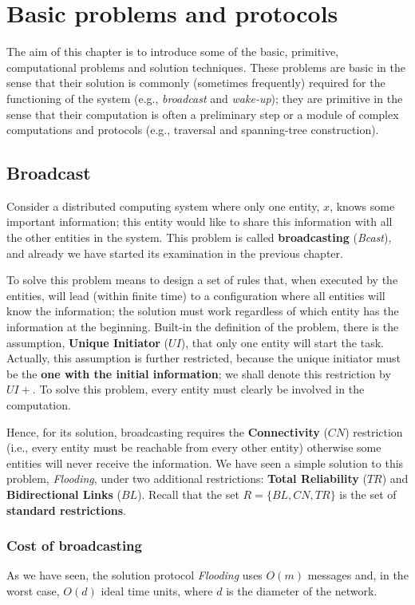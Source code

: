 \section{Basic problems and protocols}
The aim of this chapter is to introduce some of the basic, primitive, computational problems and solution techniques. These problems are basic in the sense that their solution is commonly (sometimes frequently) required for the functioning of the system (e.g., \textit{broadcast} and \textit{wake-up}); they are primitive in the sense that their computation is often a preliminary step or a module of complex computations and protocols (e.g., traversal and spanning-tree construction).

\subsection{Broadcast}
Consider a distributed computing system where only one entity, $x$, knows some important information; this entity would like to share this information with all the other entities in the system. This problem is called \textbf{broadcasting} (\textit{Bcast}), and already we have started its examination in the previous chapter. 

To solve this problem means to design a set of rules that, when executed by the entities, will lead (within finite time) to a configuration where all entities will know the information; the solution must work regardless of which entity has the information at the beginning. Built-in the definition of the problem, there is the assumption, \textbf{Unique Initiator} ($UI$), that only one entity will start the task. Actually, this assumption is further restricted, because the unique initiator must be the \textbf{one with the initial information}; we shall denote this restriction by $UI+$. To solve this problem, every entity must clearly be involved in the computation.

Hence, for its solution, broadcasting requires the \textbf{Connectivity} ($CN$) restriction (i.e., every entity must be reachable from every other entity) otherwise some entities will never receive the information. We have seen a simple solution to this problem, \textit{Flooding}, under two additional restrictions: \textbf{Total Reliability} ($TR$) and \textbf{Bidirectional Links} ($BL$). Recall that the set $R =\{BL, CN, TR\}$ is the set of \textbf{standard restrictions}.

\subsubsection{Cost of broadcasting}
As we have seen, the solution protocol \textit{Flooding} uses $O(m)$ messages and, in the worst case, $O(d)$ ideal time units, where $d$ is the diameter of the network. 

